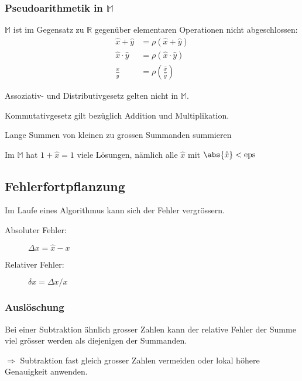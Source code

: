 		\subsubsection{Pseudoarithmetik in $\mathbb{M}$} $\mathbb{M}$ ist im Gegensatz zu $\mathbb{R}$ gegenüber elementaren Operationen nicht abgeschlossen: 
			\begin{align*}
				\hat x + \hat y &= \rho(\hat x + \hat y) \\
				\hat x \cdot \hat y &= \rho(\hat x \cdot \hat y) \\
				\frac{\hat x}{\hat y} &= \rho\left(\frac{\hat x}{\hat y}\right)
			\end{align*}
			
			\begin{regeln}
				\item Assoziativ- und Distributivgesetz gelten nicht in $\mathbb{M}$. 
				\item Kommutativgesetz gilt bezüglich Addition und Multiplikation. 
			\end{regeln}
			
			\begin{folgerungen}
				\item Lange Summen von kleinen zu grossen Summanden summieren
				\item Im $\mathbb M$ hat $1 + \hat x = 1$ viele Lösungen, nämlich alle $\hat x$ mit $\abs{\hat x} < \mathrm{eps}$
			\end{folgerungen}
			
	\subsection{Fehlerfortpflanzung}
		Im Laufe eines Algorithmus kann sich der Fehler vergrössern.
		
		\begin{description}
			\item[Absoluter Fehler:] $\Delta x = \hat x - x$
			\item[Relativer Fehler:] $\delta x = \Delta x / x$
		\end{description}
		
		\subsubsection{Auslöschung}
			Bei einer Subtraktion ähnlich grosser Zahlen kann der relative Fehler der Summe viel grösser werden als diejenigen der Summanden.
			
			$\Rightarrow$ Subtraktion fast gleich grosser Zahlen vermeiden oder lokal höhere Genauigkeit anwenden.
			
